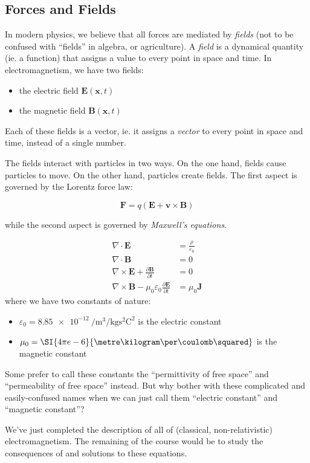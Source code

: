 \documentclass[a4paper]{article}
\begin{document}
\subsection{Forces and Fields}
In modern physics, we believe that all forces are mediated by \emph{fields} (not to be confused with ``fields'' in algebra, or agriculture). A \emph{field} is a dynamical quantity (ie. a function) that assigns a value to every point in space and time. In electromagnetism, we have two fields:
\begin{itemize}
  \item the electric field $\mathbf{E}(\mathbf{x}, t)$
  \item the magnetic field $\mathbf{B}(\mathbf{x}, t)$
\end{itemize}
Each of these fields is a vector, ie. it assigns a \emph{vector} to every point in space and time, instead of a single number.

The fields interact with particles in two ways. On the one hand, fields cause particles to move. On the other hand, particles create fields. The first aspect is governed by the Lorentz force law:
\begin{law}
\[
  \mathbf{F} = q(\mathbf{E} + \mathbf{v}\times \mathbf{B})
\]
\end{law}
\noindent while the second aspect is governed by \emph{Maxwell's equations}.
\begin{law}
  \begin{align*}
    \nabla \cdot \mathbf{E} &= \frac{\rho}{\varepsilon_0}\\
    \nabla \cdot \mathbf{B} &= 0\\
    \nabla \times \mathbf{E} +\frac{\partial \mathbf{B}}{\partial t} &= 0\\
    \nabla \times \mathbf{B} - \mu_0\varepsilon_0 \frac{\partial \mathbf{E}}{\partial t} &= \mu_0 \mathbf{J}
  \end{align*}
  where we have two constants of nature:
  \begin{itemize}
    \item $\varepsilon_0 = \SI{8.85e-12}{\per\metre\cubed\per\kilogram\s\squared\coulomb\squared}$ is the electric constant
    \item $\mu_0 = \SI{4\pi e-6}{\metre\kilogram\per\coulomb\squared}$ is the magnetic constant
  \end{itemize}
  Some prefer to call these constants the ``permittivity of free space'' and ``permeability of free space'' instead. But why bother with these complicated and easily-confused names when we can just call them ``electric constant'' and ``magnetic constant''?
\end{law}
We've just completed the description of all of (classical, non-relativistic) electromagnetism. The remaining of the course would be to study the consequences of and solutions to these equations.
\end{document}
